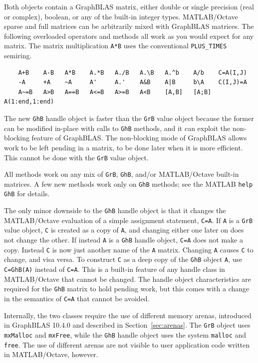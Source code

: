 Both objects contain a GraphBLAS matrix, either double or single precision
(real or complex), boolean, or any of the built-in integer types.
MATLAB/Octave sparse and full matrices can be arbitrarily mixed with GraphBLAS
matrices.  The following overloaded operators and methods all work as you would
expect for any matrix.  The matrix multiplication \verb'A*B' uses the
conventional \verb'PLUS_TIMES' semiring.

{\footnotesize
\begin{verbatim}
    A+B    A-B   A*B    A.*B   A./B   A.\B   A.^b    A/b    C=A(I,J)
    -A     +A    ~A     A'     A.'    A&B    A|B     b\A    C(I,J)=A
    A~=B   A>B   A==B   A<=B   A>=B   A<B    [A,B]   [A;B]  A(1:end,1:end) \end{verbatim}}

The new \verb'GhB' handle object is faster than the \verb'GrB' value object
because the former can be modified in-place with calls to \verb'GhB' methods,
and it can exploit the non-blocking feature of GraphBLAS.  The non-blocking
mode of GraphBLAS allows work to be left pending in a matrix, to be done later
when it is more efficient.  This cannot be done with the \verb'GrB' value
object.

All methods work on any mix of \verb'GrB', \verb'GhB', and/or MATLAB/Octave
built-in matrices.  A few new methods work only on \verb'GhB' methods; see the
MATLAB \verb'help GhB' for details.

The only minor downside to the \verb'GhB' handle object is that it changes the
MATLAB/Octave evaluation of a simple assignment statement, \verb'C=A'.  If
\verb'A' is a \verb'GrB' value object, \verb'C' is created as a copy of
\verb'A', and changing either one later on does not change the other.  If
instead \verb'A' is a \verb'GhB' handle object, \verb'C=A' does not make a
copy.  Instead \verb'C' is now just another name of the \verb'A' matrix.
Changing \verb'A' causes \verb'C' to change, and visa versa.  To construct
\verb'C' as a deep copy of the \verb'GhB' object \verb'A', use \verb'C=GhB(A)'
instead of \verb'C=A'.  This is a built-in feature of any handle class in
MATLAB/Octave that cannot be changed.  The handle object characteristics are
required for the \verb'GhB' matrix to hold pending work, but this comes with a
change in the semantics of \verb'C=A' that cannot be avoided.

Internally, the two classes require the use of different memory arenas,
introduced in GraphBLAS 10.4.0 and described in Section~\ref{sec:arenas}.  The
\verb'GrB' object uses \verb'mxMalloc' and \verb'mxFree', while the \verb'GhB'
handle object uses the system \verb'malloc' and \verb'free'.  The use of
different arenas are not visible to user application code written in
MATLAB/Octave, however.

